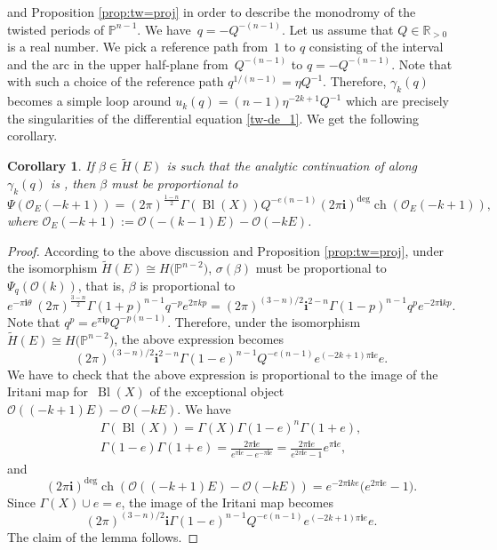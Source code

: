 \documentclass[10pt,a4paper]{article}
\numberwithin{equation}{section}
\newtheorem{Corollary}[Theorem]{Corollary}
\newcommand{\leftexp}[2]{{\vphantom{#2}}^{#1}{#2}}
\newcommand{\PP}{\mathbb{P}}
\newcommand{\RR}{\mathbb{R}}
\newcommand{\ii}{\mathbf{i}}
\renewcommand{\O}{\mathcal{O}}
\begin{document}
and Proposition \ref{prop:tw=proj} in order to describe the monodromy
of the twisted periods of $\PP^{n-1}$. We have~${q=-Q^{-(n-1)}}$. Let us
assume that $Q\in \RR_{>0}$ is a real number. We pick a reference path
from~$1$ to $q$ consisting of the interval \smash{$\big[1,Q^{-(n-1)}\big]$} and the arc in
the upper half-plane from~${Q^{-(n-1)}}$ to $q = - Q^{-(n-1)}.$
Note that with such a choice of the reference path $q^{1/(n-1)}=\eta Q^{-1}$. Therefore, $\gamma_k(q)$ becomes a simple loop around $u_k(q)=(n-1)
\eta^{-2k+1} Q^{-1}$ which are precisely the singularities of the
differential equation \eqref{tw-de_1}. We get the following corollary.
\begin{Corollary}\label{cor:tw_refl}
If $\beta\in \widetilde{H}(E)$ is such that the analytic continuation
of \smash{$\leftexp{tw}{I}^{(-m)}_\beta(Q,\lambda)$} along $\gamma_k(q)$ is
\smash{$\leftexp{tw}{I}^{(-m)}_{-\beta}(Q,\lambda)$}, then $\beta$ must be
proportional to
\[
\Psi(\O_E(-k+1)) = (2\pi)^{\frac{1-n}{2}}
\Gamma(\operatorname{Bl}(X)) Q^{-e(n-1)}
(2\pi\ii)^{\operatorname{deg}}
\operatorname{ch}(\O_E(-k+1)),
\]
where $\O_E(-k+1):=\O(-(k-1) E)-\O(-kE)$.
\end{Corollary}

\begin{proof}
According to the above discussion and Proposition \ref{prop:tw=proj},
under the isomorphism $\widetilde{H}(E)\cong H\big(\PP^{n-2}\big)$,
$\sigma(\beta)$ must be proportional to $\Psi_q(\O(k))$, that is,
$\beta$ is proportional to
\[
e^{-\pi\ii \theta} \
(2\pi)^{\frac{3-n}{2}} \Gamma(1+p)^{n-1} q^{-p} e^{2\pi k p}=
(2\pi)^{(3-n)/2} \ii^{2-n}
\Gamma(1-p)^{n-1} q^p e^{-2\pi\ii k p}.
\]
Note that $q^p = e^{\pi\ii p} Q^{-p(n-1)}$. Therefore, under the
isomorphism $\widetilde{H}(E)\cong H\big(\PP^{n-2}\big)$, the above
expression becomes
\[
(2\pi)^{(3-n)/2} \ii^{2-n}
\Gamma(1-e)^{n-1} Q^{-e(n-1)} e^{(-2k+1)\pi\ii e} e.
\]
We have to check that the above expression is proportional to the
image of the Iritani map for~$\operatorname{Bl}(X)$ of the exceptional object
$\O((-k+1)E)-\O(-kE).$ We have
\begin{gather*}
\Gamma(\operatorname{Bl}(X))= \Gamma(X) \Gamma(1-e)^n \Gamma(1+e),\\
\Gamma(1-e)\Gamma(1+e) = \frac{2\pi\ii e}{e^{\pi\ii e}-e^{-\pi\ii
 e}} =
\frac{2\pi\ii e}{e^{2\pi\ii e}-1} e^{\pi\ii e},
\end{gather*}
and
\[
(2\pi\ii)^{\operatorname{deg}}
\operatorname{ch}(\O((-k+1)E)-\O(-kE))=
e^{-2\pi\ii k e }\big(e^{2\pi\ii e}-1\big).
\]
Since $\Gamma(X)\cup e= e$, the image of the Iritani map becomes
\[
(2\pi)^{(3-n)/2} \ii \Gamma(1-e)^{n-1} Q^{-e(n-1)}
e^{(-2k+1)\pi\ii e} e.
\]
The claim of the lemma follows.
\end{proof}
\end{document}

